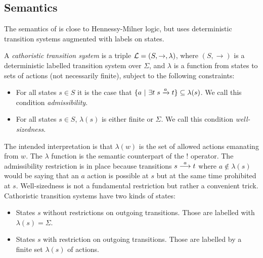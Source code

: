 \subsection{Semantics}

\NI The semantics of \cathoristic{} is close to Hennessy-Milner logic,
but uses deterministic transition systems augmented with labels on
states.



\begin{definition}\label{cathoristicTS}
A \emph{cathoristic transition system} is a triple $\mathcal{L} = (S,
\rightarrow, \lambda)$, where $(S, \rightarrow)$ is a deterministic
labelled transition system over $\Sigma$, and $\lambda$ is a function
from states to sets of actions (not necessarily finite), subject to
the following constraints:
\begin{itemize}

\item For all states $s \in S$ it is the case that $ \{a \ | \  \exists
  t \; s \xrightarrow{a} t\} \subseteq \lambda(s)$. We call this
  condition \emph{admissibility}.

\item For all states $s \in S$, $\lambda (s)$ is either finite or
  $\Sigma$. We call this condition \emph{well-sizedness}.

\end{itemize}
\end{definition}

\NI The intended interpretation is that $\lambda(w)$ is the set of
allowed actions emanating from $w$.  The $\lambda$ function
is the semantic counterpart of the $!$ operator.  The admissibility
restriction is in place because transitions $s \stackrel{a}{\longrightarrow} t$ where $a
\notin \lambda(s)$ would be saying that an $a$ action is possible at
$s$ but at the same time prohibited at $s$.
Well-sizedness is not a fundamental restriction but rather a
convenient trick. Cathoristic transition systems have two kinds
of states:

\begin{itemize}

\item States $s$ without restrictions on outgoing transitions. Those are
  labelled with $\lambda ( s) = \Sigma$.

\item States $s$ with restriction on outgoing transitions. Those are
  labelled by a finite set $\lambda ( s)$ of actions.

\end{itemize}

